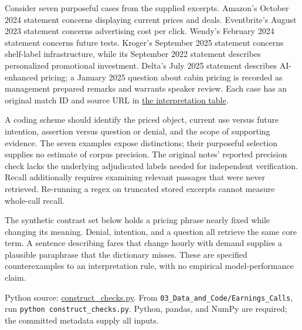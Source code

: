 \noindent \noindent Consider seven purposeful cases from the supplied excerpts.
Amazon's October 2024 statement concerns displaying current prices and
deals. Eventbrite's August 2023 statement concerns advertising cost per
click. Wendy's February 2024 statement concerns future tests. Kroger's
September 2025 statement concerns shelf-label infrastructure, while its
September 2022 statement describes personalized promotional investment.
Delta's July 2025 statement describes AI-enhanced pricing; a January
2025 question about cabin pricing is recorded as management prepared
remarks and warrants speaker review. Each case has an original match ID
and source URL in
\href{../03_Data_and_Code/Earnings_Calls/data/interpretation_cases.csv}{the
interpretation table}.

A coding scheme should identify the priced object, current use versus
future intention, assertion versus question or denial, and the scope of
supporting evidence. The seven examples expose distinctions; their
purposeful selection supplies no estimate of corpus precision. The
original notes' reported precision check lacks the underlying
adjudicated labels needed for independent verification. Recall
additionally requires examining relevant passages that were never
retrieved. Re-running a regex on truncated stored excerpts cannot
measure whole-call recall.

The synthetic contrast set below holds a pricing phrase nearly fixed
while changing its meaning. Denial, intention, and a question all
retrieve the same core term. A sentence describing fares that change
hourly with demand supplies a plausible paraphrase that the dictionary
misses. These are specified counterexamples to an interpretation rule,
with no empirical model-performance claim.

\FloatBarrier
{}
Python source:
\href{../03_Data_and_Code/Earnings_Calls/construct_checks.py}{construct\_checks.py}.
From \texttt{03\_Data\_and\_Code/Earnings\_Calls}, run
\texttt{python\ construct\_checks.py}. Python, pandas, and NumPy are
required; the committed metadata supply all inputs.

